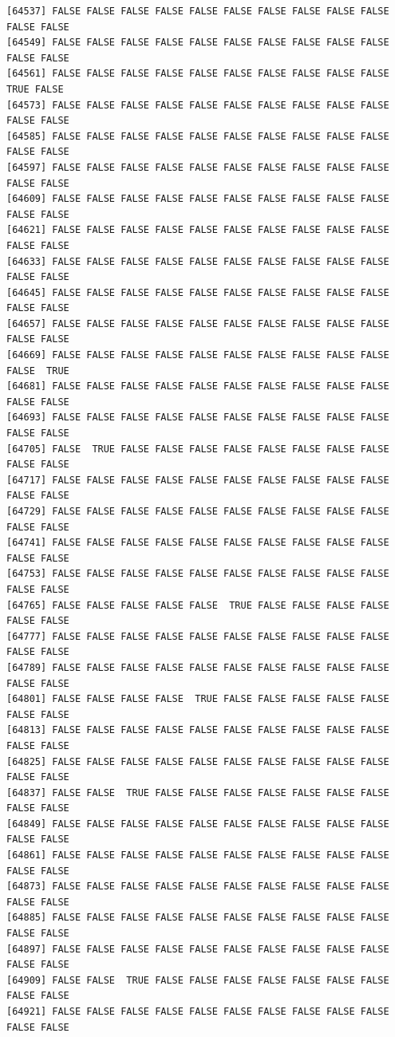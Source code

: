 \documentclass[
  a4paper,
  DIV=11,
  numbers=noendperiod]{scrartcl}
\begin{document}
\begin{verbatim}
[64537] FALSE FALSE FALSE FALSE FALSE FALSE FALSE FALSE FALSE FALSE FALSE FALSE
[64549] FALSE FALSE FALSE FALSE FALSE FALSE FALSE FALSE FALSE FALSE FALSE FALSE
[64561] FALSE FALSE FALSE FALSE FALSE FALSE FALSE FALSE FALSE FALSE  TRUE FALSE
[64573] FALSE FALSE FALSE FALSE FALSE FALSE FALSE FALSE FALSE FALSE FALSE FALSE
[64585] FALSE FALSE FALSE FALSE FALSE FALSE FALSE FALSE FALSE FALSE FALSE FALSE
[64597] FALSE FALSE FALSE FALSE FALSE FALSE FALSE FALSE FALSE FALSE FALSE FALSE
[64609] FALSE FALSE FALSE FALSE FALSE FALSE FALSE FALSE FALSE FALSE FALSE FALSE
[64621] FALSE FALSE FALSE FALSE FALSE FALSE FALSE FALSE FALSE FALSE FALSE FALSE
[64633] FALSE FALSE FALSE FALSE FALSE FALSE FALSE FALSE FALSE FALSE FALSE FALSE
[64645] FALSE FALSE FALSE FALSE FALSE FALSE FALSE FALSE FALSE FALSE FALSE FALSE
[64657] FALSE FALSE FALSE FALSE FALSE FALSE FALSE FALSE FALSE FALSE FALSE FALSE
[64669] FALSE FALSE FALSE FALSE FALSE FALSE FALSE FALSE FALSE FALSE FALSE  TRUE
[64681] FALSE FALSE FALSE FALSE FALSE FALSE FALSE FALSE FALSE FALSE FALSE FALSE
[64693] FALSE FALSE FALSE FALSE FALSE FALSE FALSE FALSE FALSE FALSE FALSE FALSE
[64705] FALSE  TRUE FALSE FALSE FALSE FALSE FALSE FALSE FALSE FALSE FALSE FALSE
[64717] FALSE FALSE FALSE FALSE FALSE FALSE FALSE FALSE FALSE FALSE FALSE FALSE
[64729] FALSE FALSE FALSE FALSE FALSE FALSE FALSE FALSE FALSE FALSE FALSE FALSE
[64741] FALSE FALSE FALSE FALSE FALSE FALSE FALSE FALSE FALSE FALSE FALSE FALSE
[64753] FALSE FALSE FALSE FALSE FALSE FALSE FALSE FALSE FALSE FALSE FALSE FALSE
[64765] FALSE FALSE FALSE FALSE FALSE  TRUE FALSE FALSE FALSE FALSE FALSE FALSE
[64777] FALSE FALSE FALSE FALSE FALSE FALSE FALSE FALSE FALSE FALSE FALSE FALSE
[64789] FALSE FALSE FALSE FALSE FALSE FALSE FALSE FALSE FALSE FALSE FALSE FALSE
[64801] FALSE FALSE FALSE FALSE  TRUE FALSE FALSE FALSE FALSE FALSE FALSE FALSE
[64813] FALSE FALSE FALSE FALSE FALSE FALSE FALSE FALSE FALSE FALSE FALSE FALSE
[64825] FALSE FALSE FALSE FALSE FALSE FALSE FALSE FALSE FALSE FALSE FALSE FALSE
[64837] FALSE FALSE  TRUE FALSE FALSE FALSE FALSE FALSE FALSE FALSE FALSE FALSE
[64849] FALSE FALSE FALSE FALSE FALSE FALSE FALSE FALSE FALSE FALSE FALSE FALSE
[64861] FALSE FALSE FALSE FALSE FALSE FALSE FALSE FALSE FALSE FALSE FALSE FALSE
[64873] FALSE FALSE FALSE FALSE FALSE FALSE FALSE FALSE FALSE FALSE FALSE FALSE
[64885] FALSE FALSE FALSE FALSE FALSE FALSE FALSE FALSE FALSE FALSE FALSE FALSE
[64897] FALSE FALSE FALSE FALSE FALSE FALSE FALSE FALSE FALSE FALSE FALSE FALSE
[64909] FALSE FALSE  TRUE FALSE FALSE FALSE FALSE FALSE FALSE FALSE FALSE FALSE
[64921] FALSE FALSE FALSE FALSE FALSE FALSE FALSE FALSE FALSE FALSE FALSE FALSE

\end{verbatim}
\end{document}

